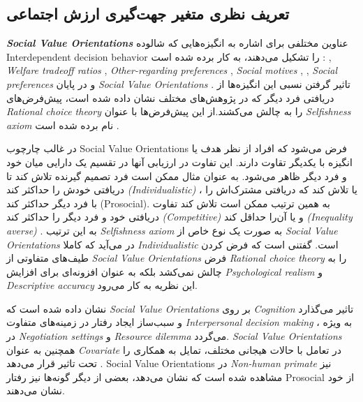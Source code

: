\subsection{تعریف نظری متغیر جهت‌گیری ارزش اجتماعی}
\textit{
    \textbf{
        \gls{Social Value Orientations}
    }
}
عناوین مختلفی برای اشاره به انگیزه‌هایی که شالوده
\gls{Interdependent decision behavior}
را تشکیل می‌دهند، به کار برده شده است
\!:
\!,
\textit{
    \gls{Welfare tradeoff ratios}
}
\!,
\textit{
    \gls{Other-regarding preferences}
}
\!,
\textit{
    \gls{Social motives}
}
\!,
\!,
\textit{
    \gls{Social preferences}
}
و در پایان
\textit{
    \gls{Social Value Orientations}
}
\!\citep{murphyMeasuringSocialValue2011}.
تاثیر گرفتن نسبی این انگیزه‌ها از دریافتی فرد دیگر که
در پژوهش‌های مختلف نشان داده شده است، پیش‌فرض‌های
\textit{
    \gls{Rational choice theory}
}
را به چالش می‌کشند.از این پیش‌فرض‌ها با عنوان
\textit{
    \gls{Selfishness axiom}
}
نام برده شده است
\!\citep{henrichEconomicManCrosscultural2005}.

در غالب چارچوب
\gls{Social Value Orientations}
فرض می‌شود که افراد از نظر هدف یا انگیزه با یکدیگر تقاوت دارند. این
تفاوت در ارزیابی آنها در تقسیم یک دارایی میان خود
و فرد دیگر ظاهر می‌شود. به عنوان مثال ممکن است فرد تصمیم گیرنده
تلاش کند تا دریافتی خودش را حداکثر کند
\textit{
    \!(\gls{Individualistic})
}،
یا تلاش کند که دریافتی مشترک‌اش را با فرد دیگر حداکثر کند
\!(\gls{Prosocial}).
به همین ترتیب ممکن است تلاش کند تفاوت دریافتی خود و فرد دیگر را حداکثر کند
\textit{
    \!(\gls{Competitive})
}
و
یا آن‌را حداقل کند
\textit{
    \!(\gls{Inequality averse})
}.
به این ترتیب
\textit{
    \gls{Selfishness axiom}
}
به صورت یک نوع خاص از
\textit{
    \gls{Social Value Orientations}
}
در می‌آید که کاملا
\textit{
    \gls{Individualistic}
}
است. گفتنی است که فرض کردن طیف‌های متفاوتی از
\textit{
    \gls{Social Value Orientations}
}
فرض
\textit{
    \gls{Rational choice theory}
}
را به چالش نمی‌کشد بلکه به عنوان افزونه‌ای برای افزایش
\textit{
    \gls{Psychological realism}
}
و
\textit{
    \gls{Descriptive accuracy}
}
این نظریه به کار می‌رود.

نشان داده شده است که
\textit{
    \gls{Social Value Orientations}
}
بر روی
\textit{
    \gls{Cognition}
}
تاثیر می‌گذارد و سبب‌ساز ایجاد رفتار در زمینه‌های متفاوت
\textit{
    \gls{Interpersonal decision making}
}،
به ویژه در
\textit{
    \gls{Negotiation settings}
}
\!\citep{dedreuShareShareAlike1998}
و
\textit{
    \gls{Resource dilemma}
}
\!\citep{rochCognitiveLoadEquality2000,rochEffectsEnvironmentalUncertainty1997,samuelsonMultiattributeEvaluationApproach1993}
می‌گردد.
\textit{
    \gls{Social Value Orientations}
}
همچنین به عنوان
\textit{
    \gls{Covariate}
}
در تعامل با حالات  هیجانی مختلف، تمایل به همکاری را تحت تاثیر قرار می‌دهد
\citep{zeelenbergEmotionSpecificityDecision2008}.
\gls{Social Value Orientations}
در
\textit{
    \gls{Non-human primate}
}
نیز مشاهده شده است که  نشان می‌دهد، بعضی از دیگر گونه‌ها نیز رفتار
\gls{Prosocial}
از خود نشان می‌دهند.

